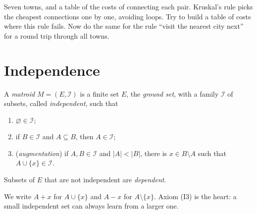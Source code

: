 \begin{think}
Seven towns, and a table of the costs of connecting each pair. Kruskal's rule picks the cheapest connections one by one,
avoiding loops. Try to build a table of costs where this rule fails. Now do the same for the rule ``visit the nearest city next''
for a round trip through all towns.
\end{think}

\section{Independence}

\begin{definition}\label{def:matroid}
A \emph{matroid} $M=(E,\mathcal I)$ is a finite set $E$, the \emph{ground set}, with a family $\mathcal I$ of subsets, called \emph{independent}, such that
\begin{enumerate}[label=(I\arabic*)]
\item $\varnothing\in\mathcal I$;
\item if $B\in\mathcal I$ and $A\subseteq B$, then $A\in\mathcal I$;
\item (\emph{augmentation}) if $A,B\in\mathcal I$ and $|A|<|B|$, there is $x\in B\setminus A$ such that $A\cup\{x\}\in\mathcal I$.
\end{enumerate}
Subsets of $E$ that are not independent are \emph{dependent}.
\end{definition}

We write $A+x$ for $A\cup\{x\}$ and $A-x$ for $A\setminus\{x\}$. Axiom (I3) is the heart: a small independent set can always learn from a larger one.

